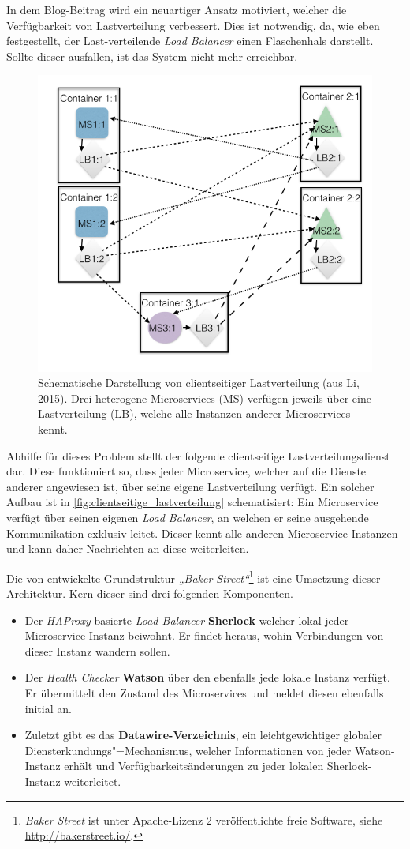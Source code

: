 In dem Blog-Beitrag \cite{Li15} wird ein neuartiger Ansatz motiviert, welcher die Verfügbarkeit von Lastverteilung verbessert. Dies ist notwendig, da, wie eben festgestellt, der Last-verteilende \textit{Load Balancer} einen Flaschenhals darstellt. Sollte dieser ausfallen, ist das System nicht mehr erreichbar.

\begin{figure}[h]
	\centering
	\includegraphics[width=.55\linewidth]{img/clientloadbal}
	\caption{Schematische Darstellung von clientseitiger Lastverteilung (aus Li, 2015). Drei heterogene Microservices (MS) verfügen jeweils über eine Lastverteilung (LB), welche alle Instanzen anderer Microservices kennt.}
	\label{fig:clientseitige_lastverteilung}
\end{figure}

Abhilfe für dieses Problem stellt der folgende clientseitige Lastverteilungsdienst dar. Diese funktioniert so, dass jeder Microservice, welcher auf die Dienste anderer angewiesen ist, über seine eigene Lastverteilung verfügt. Ein solcher Aufbau ist in \autoref{fig:clientseitige_lastverteilung} schematisiert: Ein Microservice verfügt über seinen eigenen \textit{Load Balancer}, an welchen er seine ausgehende Kommunikation exklusiv leitet. Dieser kennt alle anderen Microservice-Instanzen und kann daher Nachrichten an diese weiterleiten.

Die von \citeauthor{Li15} entwickelte Grundstruktur \textit{„Baker Street“}\footnote{\textit{Baker Street} ist unter Apache-Lizenz 2 veröffentlichte freie Software, siehe \url{http://bakerstreet.io/}.} ist eine Umsetzung dieser Architektur. Kern dieser sind drei folgenden Komponenten.

\begin{itemize}
	\item Der \textit{HAProxy}-basierte \textit{Load Balancer} \textbf{Sherlock} welcher lokal jeder Microservice-Instanz beiwohnt. Er findet heraus, wohin Verbindungen von dieser Instanz wandern sollen.
	
	\item Der \textit{Health Checker} \textbf{Watson} über den ebenfalls jede lokale Instanz verfügt. Er übermittelt den Zustand des Microservices und meldet diesen ebenfalls initial an.
	
	\item Zuletzt gibt es das \textbf{Datawire-Verzeichnis}, ein leichtgewichtiger globaler Diensterkundungs"=Mechanismus, welcher Informationen von jeder Watson-Instanz erhält und Verfügbarkeitsänderungen zu jeder lokalen Sherlock-Instanz weiterleitet.
\end{itemize}

